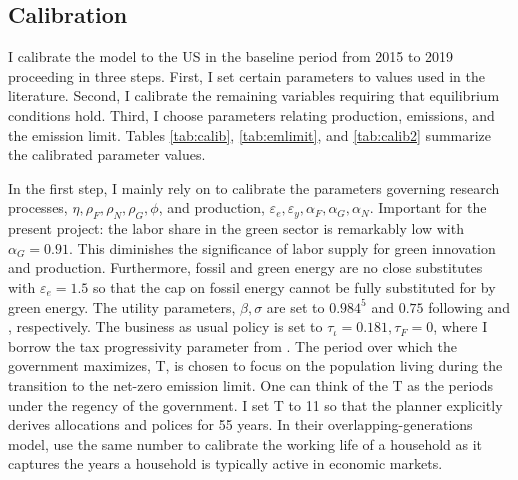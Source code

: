 \subsection{Calibration}\label{subsec:calib}
I calibrate the model to the US in the baseline period from 2015 to 2019 proceeding in three steps. First, I set certain parameters to values used in the literature. Second, I calibrate the remaining variables requiring that equilibrium conditions hold. Third, I choose parameters relating production, emissions, and the emission limit. Tables \ref{tab:calib}, \ref{tab:emlimit}, and \ref{tab:calib2} summarize the calibrated parameter values.

In the first step, I mainly rely on \cite{Fried2018ClimateAnalysis} to calibrate the parameters governing research processes, $\eta, \rho_F,\rho_N, \rho_G, \phi $, and production, $\varepsilon_e, \varepsilon_y, \alpha_F, \alpha_G, \alpha_N$.  Important for the present project: the labor share in the green sector is remarkably low with $\alpha_G=0.91$. This diminishes the significance of labor supply for green innovation and production. Furthermore, fossil and green energy are no close substitutes with $\varepsilon_e=1.5$ so that the cap on fossil energy cannot be fully substituted for by green energy. The utility parameters, $\beta, \sigma$ are set to $0.984^5$ and $0.75$ following \cite{Barrage2019OptimalPolicy} and \cite{Chetty2011AreMargins}, respectively. The business as usual policy is set to $\tau_\iota=0.181, \tau_F=0$, where I borrow the tax progressivity parameter from \cite{Heathcote2017OptimalFramework}. 
The period over which the government maximizes, T, is chosen to focus on the population living during the transition to the net-zero emission limit. 
One can think of the T as the periods under the regency of the government. I set T to 11 so that the planner 
explicitly derives  allocations and polices for 55 years. In their overlapping-generations model, \cite{Kotlikoff2021MakingWin} use the same number to calibrate the working life of a household as it captures the years a household is typically active in economic markets. 

